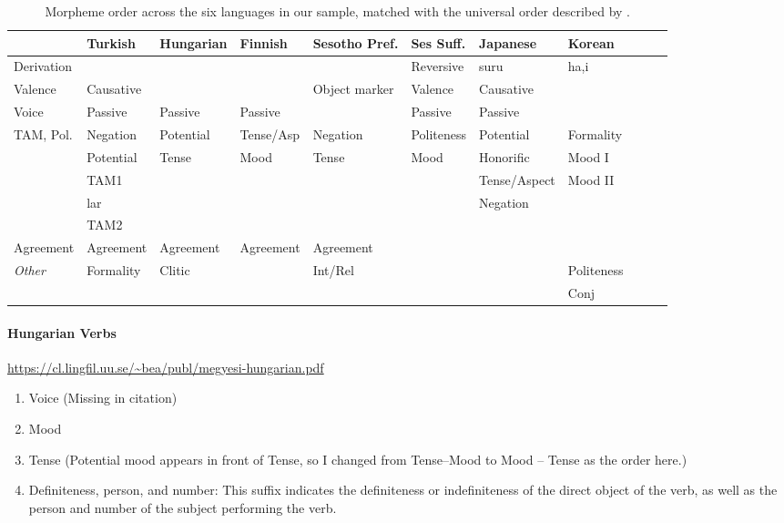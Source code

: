 \documentclass[11pt,letterpaper]{article}
\newcommand\mhahn[1]{{\color{red}(#1)}}
\newcommand\becky[1]{{\color{blue}(#1)}}
\begin{document}
\begin{table}[]
    \centering
\begin{tabular}{l||l|l|l|l|l|l|llll}
                    & Turkish & Hungarian & Finnish  & Sesotho Pref.     & Ses Suff. & Japanese & Korean\\ \hline\hline
Derivation          &  &         &          &               & Reversive & suru    & ha,i\\ \hline
Valence             &  Causative &         &           & Object marker & Valence & Causative\\ \hline
Voice               & Passive & Passive    & Passive     &               & Passive & Passive\\ \hline
TAM, Pol.           & Negation  &   Potential  &   Tense/Asp &    Negation &  Politeness &      Potential        & Formality\\
                    & Potential & Tense        &    Mood     &     Tense   &    Mood     &   Honorific  &  Mood I         \\
                    &   TAM1    &          &                &         &                  & Tense/Aspect &  Mood II\\
                    & lar       &          &           &  & & Negation \\
                    & TAM2         &           &               &          &             &  \\ \hline
Agreement           & Agreement & Agreement & Agreement & Agreement \\ \hline
\textit{Other}               & Formality          & Clitic    &              & Int/Rel &      &        & Politeness \\
                    &           &     &              &  &          &    & Conj \\
\end{tabular}
    \caption{Morpheme order across the six languages in our sample, matched with the universal order described by \cite{bybee-morphology-1985}.}
    \label{tab:my_label}
\end{table}



\paragraph{Hungarian Verbs} \url{https://cl.lingfil.uu.se/~bea/publ/megyesi-hungarian.pdf}
\begin{enumerate}
    \item Voice \becky{Missing in citation}
    \item Mood
    \item Tense \mhahn{Potential mood appears in front of Tense, so I changed from Tense--Mood to Mood -- Tense as the order here.}
    \item Definiteness, person, and number: This suffix indicates the definiteness or indefiniteness of the direct object of the verb, as well as the person and number of the subject performing the verb. 
\end{enumerate}
\end{document}
